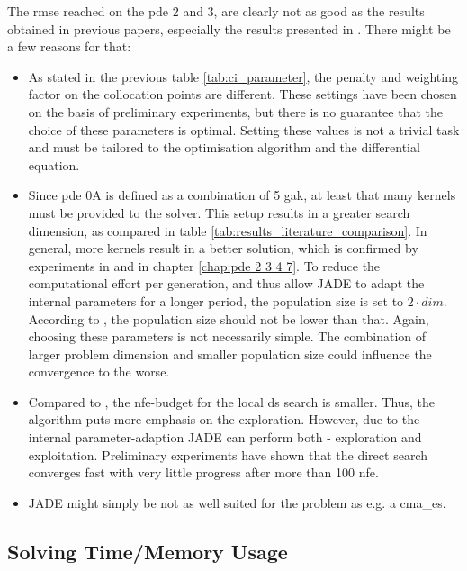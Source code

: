 \documentclass[./\jobname.tex]{subfiles}
\begin{document}
The \gls{rmse} reached on the \gls{pde} 2 and 3, are clearly not as good as the results obtained in previous papers, especially the results presented in \cite{chaquet_using_2019}. There might be a few reasons for that: 
\begin{itemize}
	\item As stated in the previous table \ref{tab:ci_parameter}, the penalty and weighting factor on the collocation points are different. These settings have been chosen on the basis of preliminary experiments, but there is no guarantee that the choice of these parameters is optimal. Setting these values is not a trivial task and must be tailored to the optimisation algorithm and the differential equation. 
	\item Since \gls{pde} 0A is defined as a combination of 5 \gls{gak}, at least that many kernels must be provided to the solver. This setup results in a greater search dimension, as compared in table \ref{tab:results_literature_comparison}. In general, more kernels result in a better solution, which is confirmed by experiments in \cite{chaquet_using_2019} and in chapter \ref{chap:pde 2 3 4 7}. 
	To reduce the computational effort per generation, and thus allow JADE to adapt the internal parameters for a longer period, the population size is set to $2 \cdot dim$. According to \cite{mallipeddi_empirical_2008}, the population size should not be lower than that. Again, choosing these parameters is not necessarily simple. The combination of larger problem dimension and smaller population size could influence the convergence to the worse. 
	\item Compared to \cite{chaquet_using_2019}, the \gls{nfe}-budget for the local \gls{ds} search is smaller. Thus, the algorithm puts more emphasis on the exploration. However, due to the internal parameter-adaption JADE can perform both - exploration and exploitation. Preliminary experiments have shown that the direct search converges fast with very little progress after more than 100 \gls{nfe}.  
	\item JADE might simply be not as well suited for the problem as e.g. a \gls{cma_es}. 
\end{itemize}



\subsection{Solving Time/Memory Usage}
\end{document}

